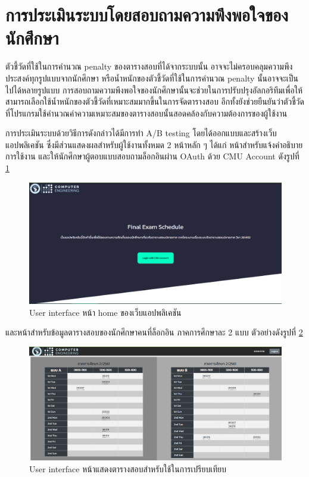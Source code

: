 \section{การประเมินระบบโดยสอบถามความพึงพอใจของนักศึกษา}
\label{sec:ab-eval-design}
ตัวชี้วัดที่ใช้ในการคำนวณ penalty ของตารางสอบที่ได้จากระบบนั้น อาจจะไม่ครอบคลุมความพึงประสงค์ทุกรูปแบบจากนักศึกษา หรือน้ำหนักของตัวชี้วัดที่ใช้ในการคำนวณ penalty นั้นอาจจะเป็นไปได้หลายรูปแบบ
\enskip การสอบถามความพึงพอใจของนักศึกษานั้นจะช่วยในการปรับปรุงอัลกอริทึมเพื่อให้สามารถเลือกใช้น้ำหนักของตัวชี้วัดที่เหมาะสมมากขึ้นในการจัดตารางสอบ
อีกทั้งยังช่วยยืนยันว่าตัวชี้วัดที่โปรแกรมใช้คํานวณค่าความเหมาะสมของตารางสอบนั้นสอดคล้องกับความต้องการของผู้ใช้งาน 

การประเมินระบบด้วยวิธีการดังกล่าวได้มีการทำ A/B testing \cite{ab-test} โดยได้ออกแบบและสร้างเว็บแอปพลิเคชัน ซึ่งมีส่วนแสดงผลสำหรับผู้ใช้งานทั้งหมด 2 หน้าหลัก ๆ ได้แก่ หน้าสำหรับแจ้งคำอธิบายการใช้งาน และให้นักศึกษาผู้ตอบแบบสอบถามล็อกอินผ่าน OAuth ด้วย CMU Account ดังรูปที่ \ref{fig:eval_ui_1}
%
\begin{figure}
    \begin{center}
      \includegraphics[width=\linewidth]{images/eval_ui_1.png}
    \end{center}
    \caption{User interface หน้า home ของเว็บแอปพลิเคชัน}
    \label{fig:eval_ui_1}     
\end{figure}
%
และหน้าสำหรับข้อมูลตารางสอบของนักศึกษาคนที่ล็อกอิน ภาคการศึกษาละ 2 แบบ ตัวอย่างดังรูปที่ \ref{fig:eval_ui_2}
%
\begin{figure}
    \begin{center}
      \includegraphics[width=\linewidth]{images/eval_ui_2.png}
    \end{center}
    \caption{User interface หน้าแสดงตารางสอบสำหรับใช้ในการเปรียบเทียบ}
    \label{fig:eval_ui_2}
\end{figure}

